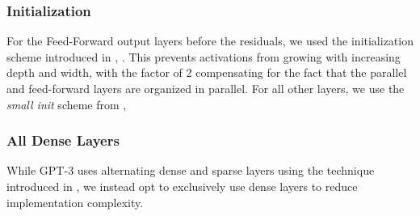 \documentclass[11pt]{article}
\begin{document}
\subsubsection{Initialization}
\label{subsubsec:init}

For the Feed-Forward output layers before the residuals, we used the initialization scheme introduced in \citet{mesh-transformer-jax}, . This prevents activations from growing with increasing depth and width, with the factor of 2 compensating for the fact that the parallel and feed-forward layers are organized in parallel. For all other layers, we use the \textit{small init} scheme from \citet{transformers-without-tears}, 

\subsubsection{All Dense Layers}
\label{subsubsec:dense-layers}
While GPT-3 uses alternating dense and sparse layers using the technique introduced in \citet{child2019generating}, we instead opt to exclusively use dense layers to reduce implementation complexity.
\end{document}
